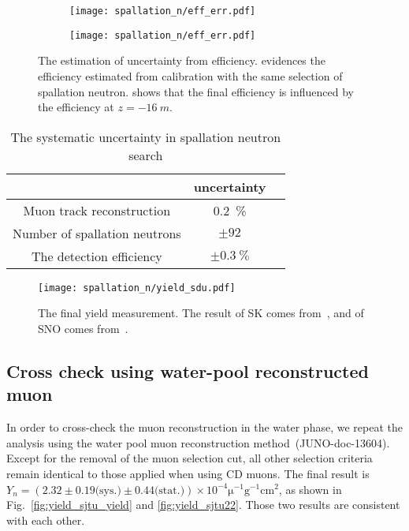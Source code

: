 \begin{figure}[htbp]
	\centering
	\begin{subfigure}{0.5\textwidth}
		\centering
		\texttt{[image: spallation\_n/eff\_err.pdf]}
		\caption{}
		\label{fig:SPNsourceCalib}
	\end{subfigure}%
	\begin{subfigure}{0.5\textwidth}
		\centering
		\texttt{[image: spallation\_n/eff\_err.pdf]}
		\caption{}
		\label{fig:muonEffUncerntainty}
	\end{subfigure}

	\caption{The estimation of uncertainty from efficiency.  evidences the efficiency estimated from  calibration with the same selection of spallation neutron.  shows that the final efficiency is influenced by the efficiency at $z=\SI{-16}{m}$.}
	\label{fig:muonEffUncer}
\end{figure}

\begin{table}[htbp]
	\caption{The systematic uncertainty in spallation neutron search}%
	\label{tab:spn_eff_un}
	\centering%
	\begin{tabular}{ccc}
		\toprule%
		                              & uncertainty       \\
		\midrule%
		Muon track reconstruction     & \SI{0.2}{\%}      \\
		Number of spallation neutrons & $\pm92$           \\
		The detection efficiency      & $\pm\SI{0.3}{\%}$ \\
		\bottomrule
	\end{tabular}
\end{table}

\begin{figure}[htbp]
	\centering
	\texttt{[image: spallation\_n/yield\_sdu.pdf]}
	\caption{The final yield measurement. The result of SK comes from~\cite{SK_spnYn}, and of SNO comes from~\cite{sno_spnYn}.}
	\label{fig:yield_final}
\end{figure}
\subsection{Cross check using water-pool reconstructed muon}
In order to cross-check the muon reconstruction in the water phase, we repeat the analysis using the water pool muon reconstruction method~(JUNO-doc-13604). Except for the removal of the muon selection cut, all other selection criteria remain identical to those applied when using CD muons. The final result is $Y_n =( 2.32\pm0.19\text{(sys.)}\pm0.44 \text{(stat.)}) \times 10^{-4}\mathrm{\mu}^{-1}\text{g}^{-1}\text{cm}^2$, as shown in Fig.~\ref{fig:yield_sjtu_yield} and \ref{fig:yield_sjtu22}. Those two results are consistent with each other.

